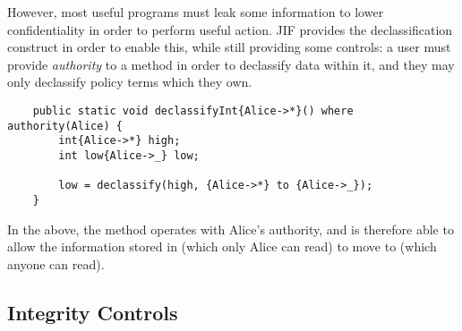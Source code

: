 However, most useful programs must leak some information to lower confidentiality in order to perform useful action. JIF provides the declassification construct in order to enable this, while still providing some controls: a user must provide \textit{authority} to a method in order to declassify data within it, and they may only declassify policy terms which they own.

\begin{verbatim}
	public static void declassifyInt{Alice->*}() where authority(Alice) {
		int{Alice->*} high;
		int low{Alice->_} low;
		
		low = declassify(high, {Alice->*} to {Alice->_});
	}
\end{verbatim}

In the above, the method operates with Alice's authority, and is therefore able to allow the information stored in  (which only Alice can read) to move to  (which anyone can read).



%
%	
%	
%		
%
%
%	
%	
%	
%	
%	

\subsection{Integrity Controls}

